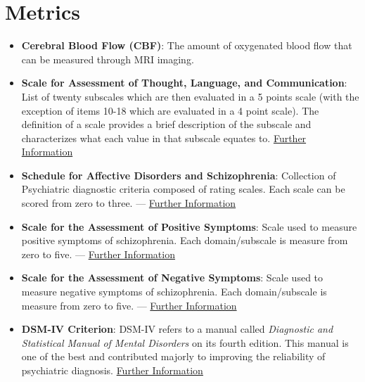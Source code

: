 \documentclass{Paper_Summary}
\begin{document}
\section{Metrics}
    \begin{itemize}
        \item \textbf{Cerebral Blood Flow (CBF)}: The amount of oxygenated blood flow that can be measured through MRI imaging.
        \item \textbf{Scale for Assessment of Thought, Language, and Communication}: List of twenty subscales which are then evaluated in a 5 points scale (with the exception of items 10-18 which are evaluated in a 4 point scale). The definition of a scale provides a brief description of the subscale and characterizes what each value in that subscale equates to. \href{https://www.northeastern.edu/cali/wp-content/uploads/2017/03/Scale-for-the-assessment-of-thought-language-and-communication.pdf}{Further Information}
        \item \textbf{Schedule for Affective Disorders and Schizophrenia}: Collection of Psychiatric diagnostic criteria composed of rating scales. Each scale can be scored from zero to three. — \href{https://en.wikipedia.org/wiki/Schedule_for_Affective_Disorders_and_Schizophrenia}{Further Information}
        \item \textbf{Scale for the Assessment of Positive Symptoms}: Scale used to measure positive symptoms of schizophrenia. Each domain/subscale is measure from zero to five. — \href{https://en.wikipedia.org/wiki/Scale_for_the_Assessment_of_Positive_Symptoms}{Further Information}
        \item \textbf{Scale for the Assessment of Negative Symptoms}: Scale used to measure negative symptoms of schizophrenia. Each domain/subscale is measure from zero to five. — \href{https://en.wikipedia.org/wiki/Scale_for_the_Assessment_of_Negative_Symptoms}{Further Information}
        \item \textbf{DSM-IV Criterion}: DSM-IV refers to a manual called \emph{Diagnostic and Statistical Manual of Mental Disorders} on its fourth edition. This manual is one of the best and contributed majorly to improving the reliability of psychiatric diagnosis. \href{https://en.wikipedia.org/wiki/Diagnostic_and_Statistical_Manual_of_Mental_Disorders#DSM-IV_(1994)}{Further Information}
         
    \end{itemize}
\end{document}
